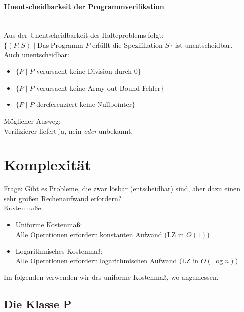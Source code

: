 \subsubsection{Unentscheidbarkeit der Programmverifikation}
\\
Aus der Unentscheidbarkeit des Halteproblems folgt:\\
$\{ (P,S) \; | \; $Das Programm $P$ erfüllt die Spezifikation $S\}$ ist unentscheidbar.\\
Auch unentscheidbar:
\begin{itemize}
\item $\{P\;|\;P$ verursacht keine Division durch $0\}$
\item $\{P\;|\;P$ verursacht keine Array-out-Bound-Fehler$\}$
\item $\{P\;|\;P$ dereferenziert keine Nullpointer$\}$
\end{itemize}
Möglicher Ausweg:\\
Verifizierer liefert ja, nein \emph{oder} unbekannt.

\chapter{Komplexität}
Frage: Gibt es Probleme, die zwar lösbar (entscheidbar) sind, aber dazu einen sehr großen Rechenaufwand erfordern?\medskip\\
Kostenmaße:
\begin{itemize}
\item Uniforme Kostenmaß:\\
Alle Operationen erfordern konstanten Aufwand (LZ in $O(1)$)
\item Logarithmisches Kostenmaß:\\
Alle Operationen erfordern logarithmischen Aufwand (LZ in $O(\log n)$)
\end{itemize}
Im folgenden verwenden wir das uniforme Kostenmaß, wo angemessen.

\section{Die Klasse P}
